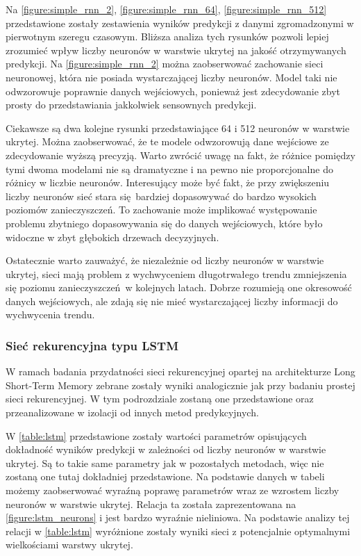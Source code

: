 \documentclass[10pt,a4paper]{article}
\begin{document}
Na \autoref{figure:simple_rnn_2}, \autoref{figure:simple_rnn_64}, \autoref{figure:simple_rnn_512} przedstawione zostały zestawienia wyników predykcji z danymi zgromadzonymi w pierwotnym szeregu czasowym. Bliższa analiza tych rysunków pozwoli lepiej zrozumieć wpływ liczby neuronów w warstwie ukrytej na jakość otrzymywanych predykcji. Na \autoref{figure:simple_rnn_2} można zaobserwować zachowanie sieci neuronowej, która nie posiada wystarczającej liczby neuronów. Model taki nie odwzorowuje poprawnie danych wejściowych, ponieważ jest zdecydowanie zbyt prosty do przedstawiania jakkolwiek sensownych predykcji. 

Ciekawsze są dwa kolejne rysunki przedstawiające 64 i 512 neuronów w warstwie ukrytej. Można zaobserwować, że te modele odwzorowują dane wejściowe ze zdecydowanie wyższą precyzją. Warto zwrócić uwagę na fakt, że różnice pomiędzy tymi dwoma modelami nie są dramatyczne i na pewno nie proporcjonalne do różnicy w liczbie neuronów. Interesujący może być fakt, że przy zwiększeniu liczby neuronów sieć stara się bardziej dopasowywać do bardzo wysokich poziomów zanieczyszczeń. To zachowanie może implikować występowanie problemu zbytniego dopasowywania się do danych wejściowych, które było widoczne w zbyt głębokich drzewach decyzyjnych.

Ostatecznie warto zauważyć, że niezależnie od liczby neuronów w warstwie ukrytej, sieci mają problem z wychwyceniem długotrwałego trendu zmniejszenia się poziomu zanieczyszczeń w kolejnych latach. Dobrze rozumieją one okresowość danych wejściowych, ale zdają się nie mieć wystarczającej liczby informacji do wychwycenia trendu. 
\newpage
\subsubsection{Sieć rekurencyjna typu LSTM}
W ramach badania przydatności sieci rekurencyjnej opartej na architekturze Long Short-Term Memory zebrane zostały wyniki analogicznie jak przy badaniu prostej sieci rekurencyjnej. W tym podrozdziale zostaną one przedstawione oraz przeanalizowane w izolacji od innych metod predykcyjnych. 

W \autoref{table:lstm} przedstawione zostały wartości parametrów opisujących dokładność wyników predykcji w zależności od liczby neuronów w warstwie ukrytej. Są to takie same parametry jak w pozostałych metodach, więc nie zostaną one tutaj dokładniej przedstawione. Na podstawie danych w tabeli możemy zaobserwować wyraźną poprawę parametrów wraz ze wzrostem liczby neuronów w warstwie ukrytej. Relacja ta została zaprezentowana na \autoref{figure:lstm_neurons} i jest bardzo wyraźnie nieliniowa. Na podstawie analizy tej relacji w \autoref{table:lstm} wyróżnione zostały wyniki sieci z potencjalnie optymalnymi wielkościami warstwy ukrytej.
\end{document}
